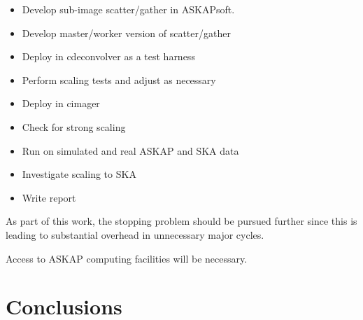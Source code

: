 \documentclass[11pt,a4paper,variablewidth]{article}
\begin{document}
\begin{itemize}
	\item Develop sub-image scatter/gather in ASKAPsoft.
	\item Develop master/worker version of scatter/gather
	\item Deploy in cdeconvolver as a test harness
	\item Perform scaling tests and adjust as necessary
	\item Deploy in cimager
	\item Check for strong scaling
	\item Run on simulated and real ASKAP and SKA data
	\item Investigate scaling to SKA
	\item Write report
\end{itemize}

As part of this work, the stopping problem should be pursued further since this is leading to substantial overhead in unnecessary major cycles.

Access to ASKAP computing facilities will be necessary. 

\pagebreak
\section{Conclusions}
\end{document}
